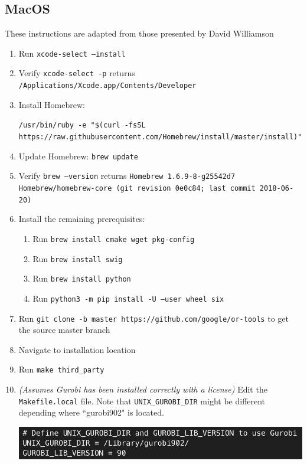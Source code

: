 \documentclass[11 pt]{article}
\newcommand{\code}[1]{\colorbox{gray!10}{\textcolor{black!85}{\texttt{#1}}}}
\begin{document}
\subsection{MacOS}
These instructions are adapted from those presented by David Williamson
\begin{enumerate}
\item Run \code{xcode-select --install} 
\item Verify \code{xcode-select -p} returns \code{/Applications/Xcode.app/Contents/Developer}
\item Install Homebrew: \newline
\begin{small} \code{/usr/bin/ruby -e "\$(curl -fsSL https://raw.githubusercontent.com/Homebrew/install/master/install)"} \end{small}
\item Update Homebrew: \code{brew update}
\item Verify \code{brew --version} returns \newline
\code{Homebrew 1.6.9-8-g25542d7} \newline
\code{Homebrew/homebrew-core (git revision 0e0c84; last commit 2018-06-20)}
\item Install the remaining prerequisites:
\begin{enumerate}
\item Run \code{brew install cmake wget pkg-config}
\item Run \code{brew install swig}
\item Run \code{brew install python}
\item Run \code{python3 -m pip install -U --user wheel six}
\end{enumerate} 
\item Run \code{git clone -b master https://github.com/google/or-tools} to get the source master branch
\item Navigate to installation location
\item Run \code{make third\_party}
\item \textit{(Assumes Gurobi has been installed correctly with a license)} Edit the \texttt{Makefile.local} file. Note that \texttt{UNIX\_GUROBI\_DIR} might be different depending where ``gurobi902" is located. 
\begin{center}
\includegraphics[scale=0.7]{images/MakefileMac.png}

\end{center}
\end{enumerate}
\end{document}
